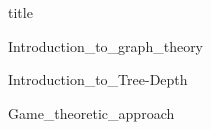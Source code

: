 \documentclass[a4paper,12pt]{article}
\begin{document}
{title}
	
{Introduction_to_graph_theory}

{Introduction_to_Tree-Depth}

{Game_theoretic_approach}
\end{document}
